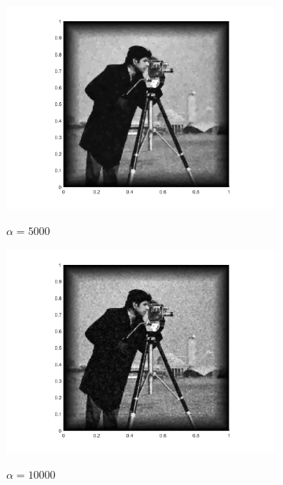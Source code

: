 \begin{figure}[!ht]
  \begin{subfigure}{.32\linewidth}
    \caption{$\alpha=5000$}
    \includegraphics[trim = 100 30 80 20, clip, width=\linewidth]
      {pictures/chapIntroduction/denoiseSNR15/alpha5000/solutionGrayscale.png}
    \label{fig:snr15alpha5000}
  \end{subfigure}
  \begin{subfigure}{.32\linewidth}
    \caption{$\alpha=10000$}
    \includegraphics[trim = 100 30 80 20, clip, width=\linewidth]
      {pictures/chapIntroduction/denoiseSNR15/alpha10000/solutionGrayscale.png}
    \label{fig:snr15alpha10000}
  \end{subfigure}
  \begin{subfigure}{.32\linewidth}

\end{subfigure}
\end{figure}
